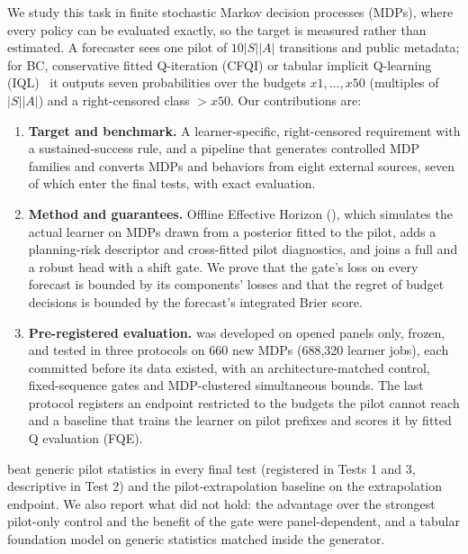 We study this task in finite stochastic Markov decision processes (MDPs), where every policy can be evaluated exactly, so the target is measured rather than estimated. A forecaster sees one pilot of $10|S||A|$ transitions and public metadata; for BC, conservative fitted Q-iteration (CFQI) or tabular implicit Q-learning (IQL)~\cite{kostrikov2022iql} it outputs seven probabilities over the budgets $x1,\ldots,x50$ (multiples of $|S||A|$) and a right-censored class $>x50$. Our contributions are:
\begin{enumerate}
\item \textbf{Target and benchmark.} A learner-specific, right-censored requirement with a sustained-success rule, and a pipeline that generates controlled MDP families and converts MDPs and behaviors from eight external sources, seven of which enter the final tests, with exact evaluation.
\item \textbf{Method and guarantees.} Offline Effective Horizon (\OEH{}), which simulates the actual learner on MDPs drawn from a posterior fitted to the pilot, adds a planning-risk descriptor and cross-fitted pilot diagnostics, and joins a full and a robust head with a shift gate. We prove that the gate's loss on every forecast is bounded by its components' losses and that the regret of budget decisions is bounded by the forecast's integrated Brier score.
\item \textbf{Pre-registered evaluation.} \OEH{} was developed on opened panels only, frozen, and tested in three protocols on 660 new MDPs (688{,}320 learner jobs), each committed before its data existed, with an architecture-matched control, fixed-sequence gates and MDP-clustered simultaneous bounds. The last protocol registers an endpoint restricted to the budgets the pilot cannot reach and a baseline that trains the learner on pilot prefixes and scores it by fitted Q evaluation (FQE).
\end{enumerate}
\OEH{} beat generic pilot statistics in every final test (registered in Tests 1 and 3, descriptive in Test 2) and the pilot-extrapolation baseline on the extrapolation endpoint. We also report what did not hold: the advantage over the strongest pilot-only control and the benefit of the gate were panel-dependent, and a tabular foundation model on generic statistics matched \OEH{} inside the generator.
